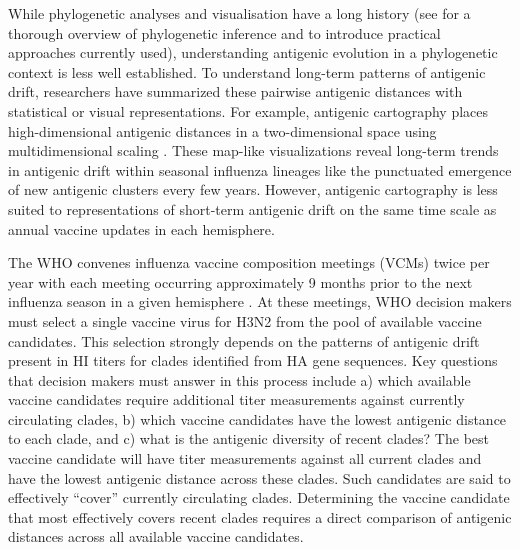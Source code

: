 \documentclass[utf8]{FrontiersinHarvard} %
\begin{document}
While phylogenetic analyses and visualisation have a long history (see \citet{felsenstein:2003} for a thorough overview of phylogenetic inference and \citet{lemey:2012} to introduce practical approaches currently used), understanding antigenic evolution in a phylogenetic context is less well established. To understand long-term patterns of antigenic drift, researchers have summarized these pairwise antigenic distances with statistical or visual representations.
For example, antigenic cartography places high-dimensional antigenic distances in a two-dimensional space using multidimensional scaling \citep{Smith:2004jc,Bedford:2014bf}.
These map-like visualizations reveal long-term trends in antigenic drift within seasonal influenza lineages like the punctuated emergence of new antigenic clusters every few years.
However, antigenic cartography is less suited to representations of short-term antigenic drift on the same time scale as annual vaccine updates in each hemisphere.

The WHO convenes influenza vaccine composition meetings (VCMs) twice per year with each meeting occurring approximately 9 months prior to the next influenza season in a given hemisphere \citep{Morris:2017ea}.
At these meetings, WHO decision makers must select a single vaccine virus for H3N2 from the pool of available vaccine candidates.
This selection strongly depends on the patterns of antigenic drift present in HI titers for clades identified from HA gene sequences.
Key questions that decision makers must answer in this process include a) which available vaccine candidates require additional titer measurements against currently circulating clades, b) which vaccine candidates have the lowest antigenic distance to each clade, and c) what is the antigenic diversity of recent clades?
The best vaccine candidate will have titer measurements against all current clades and have the lowest antigenic distance across these clades.
Such candidates are said to effectively ``cover'' currently circulating clades.
Determining the vaccine candidate that most effectively covers recent clades requires a direct comparison of antigenic distances across all available vaccine candidates.
\end{document}
